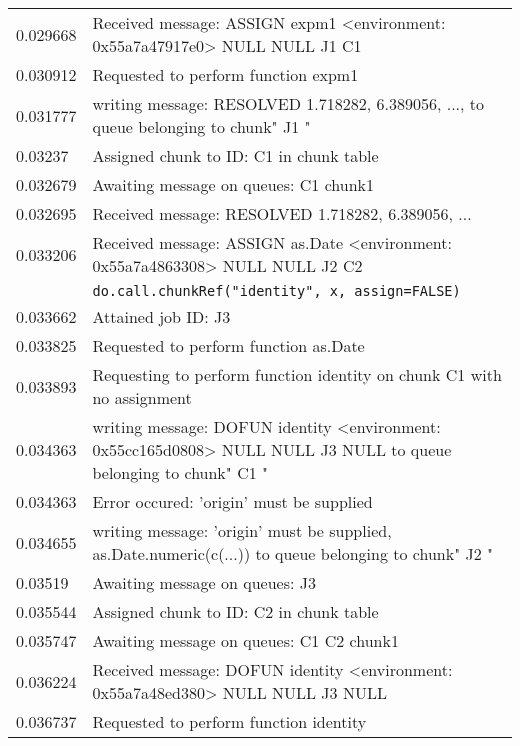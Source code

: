 \begin{table}
\begin{tabularx}{\textwidth}{lX}
		0.029668 & \textcolor{\servercolour}{Received message: ASSIGN expm1 <environment: 0x55a7a47917e0> NULL NULL J1 C1} \\
		0.030912 & \textcolor{\servercolour}{Requested to perform function expm1} \\
		0.031777 & \textcolor{\servercolour}{writing message: RESOLVED 1.718282, 6.389056, ..., to queue belonging to chunk" J1 "} \\
		0.03237  & \textcolor{\servercolour}{Assigned chunk to ID: C1 in chunk table} \\
		0.032679 & \textcolor{\servercolour}{Awaiting message on queues: C1     chunk1} \\
		0.032695 & \textcolor{\clientcolour}{Received message: RESOLVED 1.718282, 6.389056, ... } \\
		0.033206 & \textcolor{\servercolour}{Received message: ASSIGN as.Date <environment: 0x55a7a4863308> NULL NULL J2 C2} \\
			 & \textcolor{\clientcolour}{\texttt{do.call.chunkRef("identity", x, assign=FALSE)}} \\
		0.033662 & \textcolor{\clientcolour}{Attained job ID:  J3} \\
		0.033825 & \textcolor{\servercolour}{Requested to perform function as.Date} \\
		0.033893 & \textcolor{\clientcolour}{Requesting to perform function identity on chunk C1 with no assignment} \\
		0.034363 & \textcolor{\clientcolour}{writing message: DOFUN identity <environment: 0x55cc165d0808> NULL NULL J3 NULL to queue belonging to chunk" C1 "} \\
		0.034363 & \textcolor{\servercolour}{Error occured: 'origin' must be supplied} \\
		0.034655 & \textcolor{\servercolour}{writing message: 'origin' must be supplied, as.Date.numeric(c(...)) to queue belonging to chunk" J2 "} \\
		0.03519  & \textcolor{\clientcolour}{Awaiting message on queues: J3} \\
		0.035544 & \textcolor{\servercolour}{Assigned chunk to ID: C2 in chunk table} \\
		0.035747 & \textcolor{\servercolour}{Awaiting message on queues: C1     C2     chunk1} \\
		0.036224 & \textcolor{\servercolour}{Received message: DOFUN identity <environment: 0x55a7a48ed380> NULL NULL J3 NULL} \\
		0.036737 & \textcolor{\servercolour}{Requested to perform function identity} \\

\end{tabularx}
\end{table}
